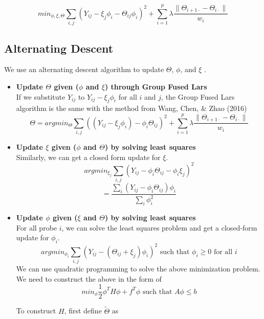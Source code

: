 \documentclass[11pt]{article}
\begin{document}
\begin{equation}
min_{\phi, \xi, \Theta} \sum_{i,j} (Y_{ij} - \xi_j \phi_i -  \Theta_{ij} \phi_i)^2 + \sum_{i=1}^p \lambda \frac{\|\Theta_{i+1\cdot} - \Theta_{i\cdot}  \|}{w_i}
\end{equation}

\subsection{Alternating Descent}
We use an alternating descent algorithm to update $\Theta$, $\phi$, and $\xi$ \cite{wang2016estimating}. 
\begin{itemize}
\item
\textbf{Update $\Theta$ given ($\phi$ and $\xi$) through Group Fused Lars \cite{bleakley2011group}}\\
If we substitute $Y_{ij}$ to $Y_{ij} - \xi_j \phi_i$ for all $i$ and $j$, the Group Fused Lars algorithm is the same with the method from Wang, Chen, \& Zhao (2016) \cite{wang2016estimating}
$$\Theta = argmin_{\Theta} \sum_{i,j} ((Y_{ij} - \xi_j \phi_i) - \phi_i \Theta_{ij})^2 + \sum_{i=1}^{p} \lambda \frac{\|\Theta_{i+1\cdot} - \Theta_{i\cdot}  \|}{w_i} $$

\item
\textbf{Update $\xi$ given ($\phi$ and $\Theta$) by solving least squares}\\
Similarly, we can get a closed form update for $\xi$.
$$argmin_{\xi_j} \sum_{i,j} (Y_{ij} - \phi_i \Theta_{ij} - \phi_i \xi_j)^2$$
$$= \frac{
\sum_i (Y_{ij}-\phi_i \Theta_{ij})\phi_i
}{
\sum_i \phi_i^2
}$$

\item
\textbf{Update $\phi$  given ($\xi$ and $\Theta$) by solving least squares}\\
For all probe $i$, we can solve the least squares problem and get a closed-form update for $\phi_i$. 
$$argmin_{\phi_i} \sum_{i,j}(Y_{ij} - (\Theta_{ij}+\xi_j)\phi_i)^2 \text{ such that } \phi_i \geq 0\text{ for all } i$$
We can use quadratic programming to solve the above minimization problem. We need to construct the above in the form of
$$min_{\phi} \frac{1}{2} \phi^T H \phi + f^T \phi \text{ such that } A\phi \leq b$$

To construct $H$, first define $\tilde{\Theta}$ as


\end{itemize}
\end{document}

